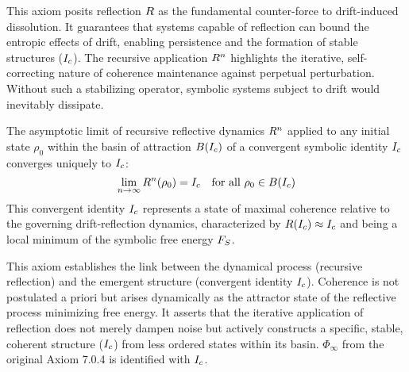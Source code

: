 \begin{remark}
\label{remark:bk7_unnamed_remark_02}
This axiom posits reflection \(R\) as the fundamental counter-force to drift-induced dissolution. It guarantees that systems capable of reflection can bound the entropic effects of drift, enabling persistence and the formation of stable structures (\(I_c\)). The recursive application \(R^n\) highlights the iterative, self-correcting nature of coherence maintenance against perpetual perturbation. Without such a stabilizing operator, symbolic systems subject to drift would inevitably dissipate.
\end{remark}
\begin{axiom}
\label{axiom:bk7_emergence_of_coherence_via_convergence}
The asymptotic limit of recursive reflective dynamics \(R^n\) applied to any initial state \(\rho_0\) within the basin of attraction \(B(I_c)\) of a convergent symbolic identity \(I_c\) converges uniquely to \(I_c\):
\[
\lim_{n\to\infty} R^n(\rho_0) = I_c \quad \text{for all } \rho_0 \in B(I_c)
\]
This convergent identity \(I_c\) represents a state of maximal coherence relative to the governing drift-reflection dynamics, characterized by \(R(I_c) \approx I_c\) and being a local minimum of the symbolic free energy \(F_S\).
\end{axiom}
\begin{remark}
\label{remark:bk7_unnamed_remark_03}
This axiom establishes the link between the dynamical process (recursive reflection) and the emergent structure (convergent identity \(I_c\)). Coherence is not postulated a priori but arises dynamically as the attractor state of the reflective process minimizing free energy. It asserts that the iterative application of reflection does not merely dampen noise but actively constructs a specific, stable, coherent structure (\(I_c\)) from less ordered states within its basin. \(\Phi_\infty\) from the original Axiom 7.0.4 is identified with \(I_c\).
\end{remark}
